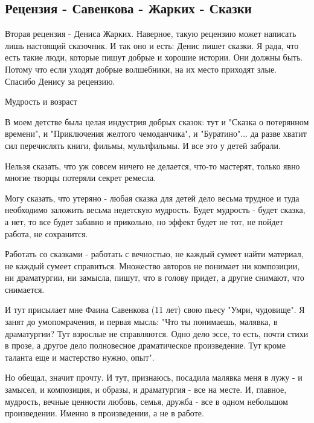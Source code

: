  
 
 
 
 

\subsection{Рецензия - Савенкова - Жарких - Сказки}

Вторая рецензия  - Дениса Жарких. Наверное, такую рецензию может написать лишь
настоящий сказочник. И так оно и есть: Денис пишет сказки. Я рада, что есть
такие люди, которые пишут добрые и хорошие истории. Они должны  быть. Потому
что если уходят добрые волшебники, на их место приходят злые. Спасибо Денису за
рецензию.

Мудрость и возраст

В моем детстве была целая индустрия добрых сказок: тут и "Сказка о потерянном
времени", и "Приключения желтого чемоданчика", и "Буратино"... да разве хватит
сил перечислять книги, фильмы, мультфильмы. И все это у детей забрали. 

Нельзя сказать, что уж совсем ничего не делается, что-то мастерят, только явно многие творцы потеряли секрет ремесла. 

Могу сказать, что утеряно - любая сказка для детей дело весьма трудное и туда
необходимо заложить весьма недетскую мудрость. Будет мудрость - будет сказка, а
нет, то все будет забавно и прикольно, но эффект будет не тот, не пойдет
работа, не сохранится. 

Работать со сказками - работать с вечностью, не каждый сумеет найти материал,
не каждый сумеет справиться. Множество авторов не понимает ни композиции, ни
драматургии, ни замысла, пишут, что в голову придет, а другие снимают, что
снимается. 

И тут присылает мне Фаина Савенкова (11 лет) свою пьесу "Умри, чудовище". Я
занят до умопомрачения, и первая мысль: "Что ты понимаешь, малявка, в
драматургии? Тут взрослые не справляются. Одно дело эссе, то есть, почти стихи
в прозе, а другое дело полновесное драматическое произведение. Тут кроме
таланта еще и мастерство нужно, опыт". 

Но обещал, значит прочту. И тут, признаюсь, посадила малявка меня в лужу - и
замысел, и композиция, и образы, и драматургия - все на месте. И, главное,
мудрость, вечные ценности любовь, семья, дружба - все в одном небольшом
произведении. Именно в произведении, а не в работе. 

